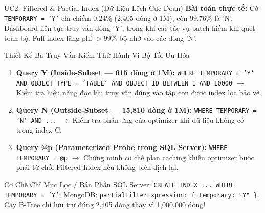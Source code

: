 \documentclass[aspectratio=169,9pt]{beamer}
\begin{document}
\begin{frame}{UC2: Filtered \& Partial Index (Dữ Liệu Lệch Cực Đoan)}
\textbf{Bài toán thực tế:} Cờ \texttt{TEMPORARY = 'Y'} chỉ chiếm $0.24\%$ (2,405 dòng ở 1M), còn $99.76\%$ là 'N'. Dashboard liên tục truy vấn dòng 'Y', trong khi các tác vụ batch hiếm khi quét toàn bộ. Full index lãng phí $>99\%$ bộ nhớ vào các dòng 'N'.

\begin{block}{Thiết Kế Ba Truy Vấn Kiểm Thử Hành Vi Bộ Tối Ưu Hóa}
\footnotesize
\begin{enumerate}
  \item \textbf{Query Y (Inside-Subset --- 615 dòng ở 1M):} \texttt{WHERE TEMPORARY = 'Y' AND OBJECT\_TYPE = 'TABLE' AND OBJECT\_ID BETWEEN 1 AND 10000} $\to$ Kiểm tra hiệu năng đọc khi truy vấn đúng vào tập con được index lọc bảo vệ.
  \item \textbf{Query N (Outside-Subset --- 15,810 dòng ở 1M):} \texttt{WHERE TEMPORARY = 'N' AND ...} $\to$ Kiểm tra phản ứng của optimizer khi dữ liệu không có trong index C.
  \item \textbf{Query @p (Parameterized Probe trong SQL Server):} \texttt{WHERE TEMPORARY = @p} $\to$ Chứng minh cơ chế plan caching khiến optimizer buộc phải từ chối Filtered Index nếu không biên dịch lại.
\end{enumerate}
\end{block}

\begin{exampleblock}{Cơ Chế Chỉ Mục Lọc / Bán Phần}
\footnotesize
SQL Server: \texttt{CREATE INDEX ... WHERE TEMPORARY = 'Y'}; MongoDB: \texttt{partialFilterExpression: \{ temporary: "Y" \}}. Cây B-Tree chỉ lưu trữ đúng 2,405 dòng thay vì 1,000,000 dòng!
\end{exampleblock}
\end{frame}
\end{document}
